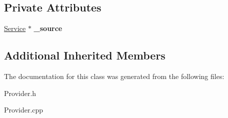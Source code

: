 \subsection*{Private Attributes}
\begin{DoxyCompactItemize}
\item 
\mbox{\label{class_generic_provider_1_1_output_connection_ac6da1944b2e7866764bdb3459c09c40b}} 
\hyperlink{class_generic_provider_1_1_service}{Service} $\ast$ {\bfseries \+\_\+source}
\end{DoxyCompactItemize}
\subsection*{Additional Inherited Members}


The documentation for this class was generated from the following files\+:\begin{DoxyCompactItemize}
\item 
Provider.\+h\item 
Provider.\+cpp\end{DoxyCompactItemize}
